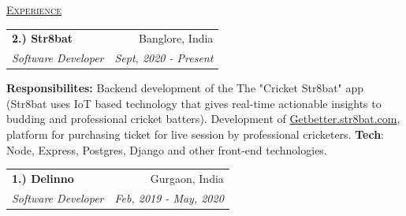 \documentclass[11pt, a4paper]{article}
\begin{document}
\setlength\tabcolsep{0pt}
\begin{flushleft}
    \uline{\textsc{\large{Experience}}\hfill}
    \newline
    \newline
\setlength\tabcolsep{0pt}
\begin{tabularx}{\textwidth}{X r}
    \large{\textbf{2.) Str8bat}} & Banglore, India\\
    \textit{Software Developer} & \textit {Sept, 2020 - Present}\\
\end{tabularx}
\begin{itemize}
    \textbf{Responsibilites:}
    Backend development of the The "Cricket Str8bat" app (Str8bat uses IoT based
    technology that gives real-time actionable insights to budding and professional
    cricket batters).
    Development of \href{https://getbetter.str8bat.com}{Getbetter.str8bat.com},
    platform for purchasing ticket for live session by professional cricketers.
    \newline
    \textbf{Tech}: Node, Express, Postgres, Django and other front-end technologies.
\end{itemize}

    \begin{tabularx}{\textwidth}{X r}
        \large{\textbf{1.) Delinno}} & Gurgaon, India\\
        \textit{Software Developer}  & \textit {Feb, 2019 - May, 2020}\\
    \end{tabularx}
\end{flushleft}
\end{document}
